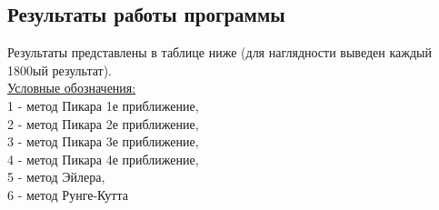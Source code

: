 \subsection*{Результаты работы программы}
Результаты представлены в таблице ниже (для наглядности выведен каждый 1800ый результат). \\

\underline{Условные обозначения:}\\
1 - метод Пикара 1е приближение,\\
2 - метод Пикара 2е приближение,\\
3 - метод Пикара 3е приближение,\\
4 - метод Пикара 4е приближение,\\
5 - метод Эйлера,\\
6 - метод Рунге-Кутта\\


